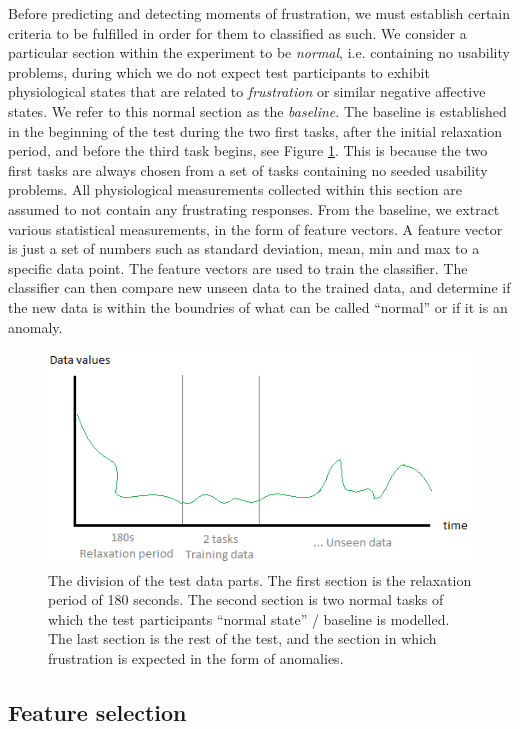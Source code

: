 Before predicting and detecting moments of frustration, we must establish certain criteria to be fulfilled in order for
them to classified as such.  We consider a particular section within the experiment to be \textit{normal},
i.e. containing no usability problems, during which we do not expect test participants to exhibit physiological states
that are related to \textit{frustration} or similar negative affective states. We refer to this normal section as the
\textit{baseline}. The baseline is established in the beginning of the test during the two first tasks, after the
initial relaxation period, and before the third task begins, see Figure \ref{[FIGURE] Data Sections}. This is because the two first tasks are always chosen from
a set of tasks containing no seeded usability problems. All physiological measurements collected within this section are assumed to not contain any frustrating responses. From the baseline, we extract various statistical measurements, in the form of
feature vectors. A feature vector is just a set of numbers such as standard deviation, mean, min and max to a specific data point. 
The feature vectors are used to train the classifier. The classifier can then compare new unseen data to the trained data, and determine if the new data is within the boundries of what can be called ``normal'' or if it is an anomaly.  
\begin{figure}
    \centering
  \includegraphics[width=0.95\columnwidth]{graphics/rest_period_training_data.png}
    \caption{The division of the test data parts. The first section is the relaxation period of 180 seconds. The second section is two normal tasks of which the test participants ``normal state'' / baseline is modelled. The last section is the rest of the test, and the section in which frustration is expected in the form of anomalies. }
    \label{[FIGURE] Data Sections}
\end{figure}
\subsection{Feature selection}

